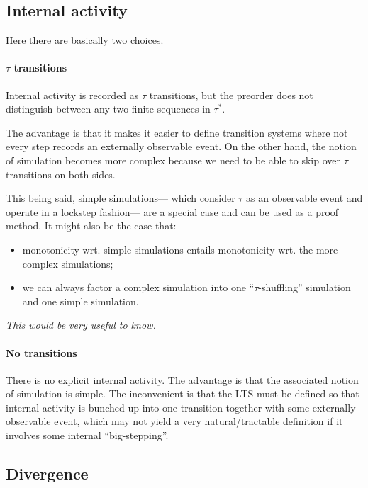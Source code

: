 \documentclass[11pt]{article}
\begin{document}

\subsection{Internal activity} %

Here there are basically two choices.

\paragraph{$\tau$ transitions}

Internal activity is recorded as $\tau$ transitions,
but the preorder does not distinguish
between any two finite sequences in $\tau^*$.

The advantage is that it makes it easier to define
transition systems where not every step
records an externally observable event.
On the other hand,
the notion of simulation becomes more complex
because we need to be able to skip over
$\tau$ transitions on both sides.

This being said, simple simulations---%
which consider $\tau$ as an observable event
and operate in a lockstep fashion---%
are a special case and can be used as a proof method.
It might also be the case that:
\begin{itemize}
  \item monotonicity wrt. simple simulations
    entails monotonicity wrt. the more complex simulations;
  \item we can always factor a complex simulation into
    one ``$\tau$-shuffling'' simulation and
    one simple simulation.
\end{itemize}
\emph{This would be very useful to know.}

\paragraph{No transitions}

There is no explicit internal activity.
The advantage is that
the associated notion of simulation is simple.
The inconvenient is that
the LTS must be defined so that
internal activity is bunched up into one transition
together with some externally observable event,
which may not yield a very natural/tractable definition
if it involves some internal ``big-stepping''.


\subsection{Divergence} %
\end{document}
